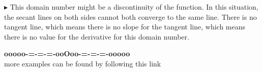 \documentclass{ximera}
\begin{document}
\textbf{\textcolor{blue!55!black}{$\blacktriangleright$}}  This domain number might be a discontinuity of the function. In this situation, the secant lines on both sides cannot both converge to the same line.  There is no tangent line, which means there is no slope for the tangent line, which means there is no value for the derivative for this domain number. \\











\begin{center}
\textbf{\textcolor{green!50!black}{ooooo-=-=-=-ooOoo-=-=-=-ooooo}} \\

more examples can be found by following this link\\ 

\end{center}
\end{document}
